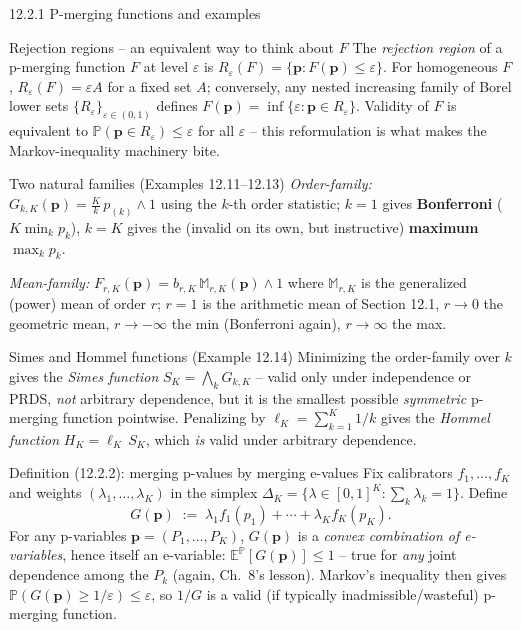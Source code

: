 \documentclass[aspectratio=169,10pt]{beamer}
\newcommand{\PP}{\mathbb{P}}
\newcommand{\EE}{\mathbb{E}}
\newcommand{\bp}{\mathbf{p}}
\begin{document}
\begin{frame}[allowframebreaks]{12.2.1 P-merging functions and examples}
  \begin{block}{Rejection regions -- an equivalent way to think about $F$}
    The \emph{rejection region} of a p-merging function $F$ at level $\varepsilon$ is $R_\varepsilon(F)=\{\bp:F(\bp)\le\varepsilon\}$. For homogeneous $F$, $R_\varepsilon(F)=\varepsilon A$ for a fixed set $A$; conversely, any nested increasing family of Borel lower sets $\{R_\varepsilon\}_{\varepsilon\in(0,1)}$ defines $F(\bp)=\inf\{\varepsilon:\bp\in R_\varepsilon\}$. Validity of $F$ is equivalent to $\PP(\bp\in R_\varepsilon)\le\varepsilon$ for all $\varepsilon$ -- this reformulation is what makes the Markov-inequality machinery bite.
  \end{block}

  \begin{block}{Two natural families (Examples 12.11--12.13)}
    \emph{Order-family:} $G_{k,K}(\bp)=\tfrac Kk\,p_{(k)}\wedge1$ using the $k$-th order statistic; $k=1$ gives \textbf{Bonferroni} ($K\min_k p_k$), $k=K$ gives the (invalid on its own, but instructive) \textbf{maximum} $\max_kp_k$.

    \emph{Mean-family:} $F_{r,K}(\bp)=b_{r,K}\,\mathbb{M}_{r,K}(\bp)\wedge1$ where $\mathbb{M}_{r,K}$ is the generalized (power) mean of order $r$; $r=1$ is the arithmetic mean of Section 12.1, $r\to0$ the geometric mean, $r\to-\infty$ the min (Bonferroni again), $r\to\infty$ the max.
  \end{block}

  \begin{block}{Simes and Hommel functions (Example 12.14)}
    Minimizing the order-family over $k$ gives the \emph{Simes function} $S_K=\bigwedge_kG_{k,K}$ -- valid only under independence or PRDS, \emph{not} arbitrary dependence, but it is the smallest possible \emph{symmetric} p-merging function pointwise. Penalizing by $\ell_K=\sum_{k=1}^K1/k$ gives the \emph{Hommel function} $H_K=\ell_K\,S_K$, which \emph{is} valid under arbitrary dependence.
  \end{block}

  \framebreak

  \begin{block}{Definition (12.2.2): merging p-values by merging e-values}
    Fix calibrators $f_1,\dots,f_K$ and weights $(\lambda_1,\dots,\lambda_K)$ in the simplex $\Delta_K=\{\lambda\in[0,1]^K:\sum_k\lambda_k=1\}$. Define
    \[
      G(\bp) \;:=\; \lambda_1f_1(p_1)+\cdots+\lambda_Kf_K(p_K).
    \]
    For any p-variables $\bp=(P_1,\dots,P_K)$, $G(\bp)$ is a \emph{convex combination of e-variables}, hence itself an e-variable: $\EE^\PP[G(\bp)]\le1$ -- true for \emph{any} joint dependence among the $P_k$ (again, Ch.\ 8's lesson). Markov's inequality then gives $\PP(G(\bp)\ge1/\varepsilon)\le\varepsilon$, so $1/G$ is a valid (if typically inadmissible/wasteful) p-merging function.
  \end{block}


\end{frame}
\end{document}
